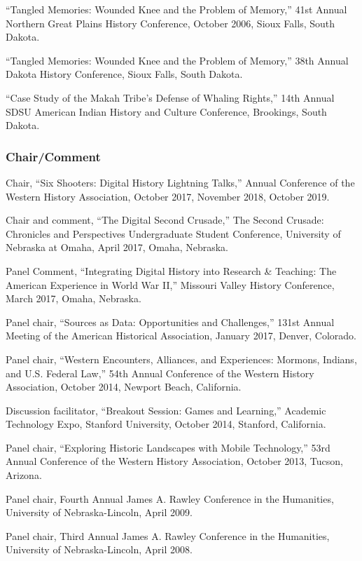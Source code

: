 ``Tangled Memories: Wounded Knee and the Problem of Memory,'' 41st
Annual Northern Great Plains History Conference, October 2006, Sioux
Falls, South Dakota.

``Tangled Memories: Wounded Knee and the Problem of Memory,'' 38th
Annual Dakota History Conference, Sioux Falls, South Dakota.

``Case Study of the Makah Tribe's Defense of Whaling Rights,'' 14th
Annual SDSU American Indian History and Culture Conference, Brookings,
South Dakota.

\subsubsection{Chair/Comment}\label{chaircomment}

Chair, ``Six Shooters: Digital History Lightning Talks,'' Annual
Conference of the Western History Association, October 2017, November
2018, October 2019.

Chair and comment, ``The Digital Second Crusade,'' The Second Crusade:
Chronicles and Perspectives Undergraduate Student Conference, University
of Nebraska at Omaha, April 2017, Omaha, Nebraska.

Panel Comment, ``Integrating Digital History into Research \& Teaching:
The American Experience in World War II,'' Missouri Valley History
Conference, March 2017, Omaha, Nebraska.

Panel chair, ``Sources as Data: Opportunities and Challenges,'' 131st
Annual Meeting of the American Historical Association, January 2017,
Denver, Colorado.

Panel chair, ``Western Encounters, Alliances, and Experiences: Mormons,
Indians, and U.S. Federal Law,'' 54th Annual Conference of the Western
History Association, October 2014, Newport Beach, California.

Discussion facilitator, ``Breakout Session: Games and Learning,''
Academic Technology Expo, Stanford University, October 2014, Stanford,
California.

Panel chair, ``Exploring Historic Landscapes with Mobile Technology,''
53rd Annual Conference of the Western History Association, October 2013,
Tucson, Arizona.

Panel chair, Fourth Annual James A. Rawley Conference in the Humanities,
University of Nebraska-Lincoln, April 2009.

Panel chair, Third Annual James A. Rawley Conference in the Humanities,
University of Nebraska-Lincoln, April 2008.

